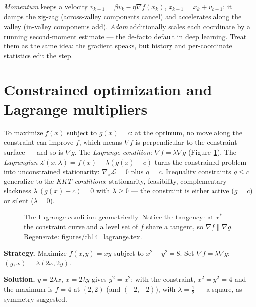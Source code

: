 \emph{Momentum} keeps a velocity $v_{k+1}=\beta
v_k-\eta\nabla f(x_k)$, $x_{k+1}=x_k+v_{k+1}$: it damps the zig-zag
(across-valley components cancel) and accelerates along the valley
(in-valley components add). \emph{Adam} additionally scales
each coordinate by a running second-moment estimate --- the de-facto
default in deep learning. Treat them as the same idea: the gradient
speaks, but history and per-coordinate statistics edit the step.

\section{Constrained optimization and Lagrange multipliers}
\label{sec:opt-lagrange}

To maximize $f(x)$ subject to $g(x)=c$: at the optimum, no move along
the constraint can improve $f$, which means $\nabla f$ is perpendicular
to the constraint surface --- and so is $\nabla g$. The
\emph{Lagrange condition}:
$\nabla f=\lambda\nabla g$ (Figure~\ref{fig:lagrange}). The
\emph{Lagrangian}
$\mathcal L(x,\lambda)=f(x)-\lambda(g(x)-c)$ turns the constrained
problem into unconstrained stationarity: $\nabla_x\mathcal L=0$
plus $g=c$. Inequality constraints $g\le c$ generalize to the
\emph{KKT conditions}: stationarity, feasibility,
complementary slackness $\lambda\,(g(x)-c)=0$ with $\lambda\ge0$ --- the
constraint is either active ($g=c$) or silent ($\lambda=0$).

\begin{figure}[htbp]
\centering

\caption{The Lagrange condition geometrically. Notice the tangency: at
$x^{*}$ the constraint curve and a level set of $f$ share a tangent, so
$\nabla f\parallel\nabla g$. Regenerate:
\ttfamily figures/ch14\_lagrange.tex.}
\label{fig:lagrange}
\end{figure}

\begin{example}\label{ex:lagrange}
\textbf{Strategy.} Maximize $f(x,y)=xy$ subject to $x^2+y^2=8$.
Set $\nabla f=\lambda\nabla g$: $(y,x)=\lambda(2x,2y)$.

\textbf{Solution.} $y=2\lambda x$, $x=2\lambda y$ gives
$y^2=x^2$; with the constraint, $x^2=y^2=4$ and the maximum is
$f=4$ at $(2,2)$ (and $(-2,-2)$), with $\lambda=\tfrac12$ ---
a square, as symmetry suggested.
\end{example}

